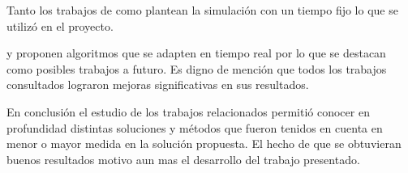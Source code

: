 Tanto los trabajos de \citet{Teo2010} como \citet{Stolfi2012} plantean la simulación con un tiempo fijo lo que se utilizó en el proyecto.

\citet{Montana1996} y \citet{Vogel2000}  proponen algoritmos que se adapten en tiempo real por lo que se destacan como posibles trabajos a futuro.
Es digno de mención que todos los trabajos consultados lograron mejoras significativas en sus resultados.

En conclusión el estudio de los trabajos relacionados permitió conocer en profundidad distintas soluciones y métodos que fueron tenidos en cuenta en menor o mayor medida en la solución propuesta. El hecho de que se obtuvieran buenos resultados motivo aun mas el desarrollo del trabajo presentado.





